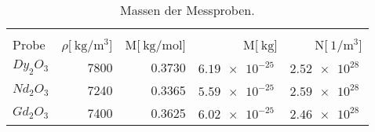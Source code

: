 
\begin{table}[!h]
\begin{center}
\begin{tabular}{|l|r|r|r|r|}
\hline
&&&&\\
Probe & $\rho$[$\SI{}{\kilo\gram\per\meter^3}$] & M[$\SI{}{\kilo\gram/\mol}$] & M[$\SI{}{\kilo\gram}$] & N[$\SI{}{1\per\meter^3}$]\\
\hline
\hline

	$Dy_2O_3$ & 7800 & 0.3730 & $\SI{6.19 e-25}{}$ & $\SI{2.52 e28}{}$\\
	$Nd_2O_3$ & 7240 & 0.3365 & $\SI{5.59 e-25}{}$ & $\SI{2.59 e28}{}$\\
	$Gd_2O_3$ & 7400 & 0.3625 & $\SI{6.02 e-25}{}$ & $\SI{2.46 e28}{}$\\

\hline
\end{tabular}
\caption{Massen der Messproben.}
\label{massen}
\end{center}
\end{table}